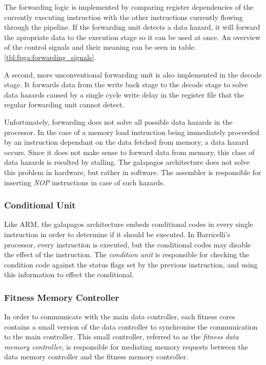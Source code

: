 The forwarding logic is implemented by comparing register dependencies of the currently executing instruction with the other instructions currently flowing through the pipeline.
If the forwarding unit detects a data hazard, it will forward the apropriate data to the execution stage so it can be used at once.
An overview of the control signals and their meaning can be seen in table. \ref{tbl:fpga:forwarding_signals}.

A second, more unconventional forwarding unit is also implemented in the decode stage.
It forwards data from the write back stage to the decode stage to solve data hazards caused by a single cycle write delay in the register file that the regular forwarding unit cannot detect.

Unfortunately, forwarding does not solve all possible data hazards in the processor.
In the case of a memory load instruction being immediately proceeded by an instruction dependant on the data fetched from memory, a data hazard occurs.
Since it does not make sense to forward data from memory, this class of data hazards is resulted by stalling.
The galapagos architecture does not solve this problem in hardware, but rather in software.
The assembler is responsible for inserting \emph{NOP} instructions in case of such hazards.  



\newpage
\subsubsection{Conditional Unit}
Like ARM, the \Gls{galapagos} architecture embeds conditional codes in every single instruction in order to determine if it should be executed.
In Barricelli's processor, every instruction is executed, but the conditional codes may disable the effect of the instruction.
The \emph{condition unit} is responsible for checking the condition code against the status flags set by the previous instruction, and using this information to effect the conditional.

\newpage
\subsubsection{Fitness Memory Controller} 
In order to communicate with the main data controller, each fitness cores contains a small version of the data controller to synchronise the communication to the main controller.
This small controller, referred to as the \emph{fitness data memory controller}, is responsible for mediating memory requests between the data memory controller and the fitness memory controller.

